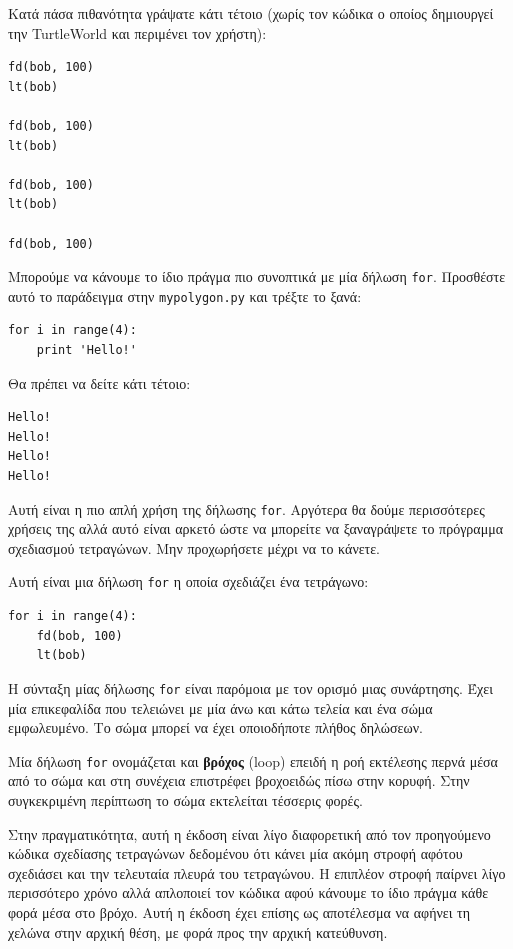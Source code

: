 \documentclass[10pt]{book}
\begin{document}
Κατά πάσα πιθανότητα γράψατε κάτι τέτοιο (χωρίς τον κώδικα ο οποίος δημιουργεί
την TurtleWorld και περιμένει τον χρήστη):

\begin{verbatim}
fd(bob, 100)
lt(bob)

fd(bob, 100)
lt(bob)

fd(bob, 100)
lt(bob)

fd(bob, 100)
\end{verbatim}
%

Μπορούμε να κάνουμε το ίδιο πράγμα πιο συνοπτικά με μία δήλωση  {\tt for}. 
Προσθέστε αυτό το παράδειγμα στην  {\tt mypolygon.py}  και τρέξτε το ξανά:


\begin{verbatim}
for i in range(4):
    print 'Hello!'
\end{verbatim}
%

Θα πρέπει να δείτε κάτι τέτοιο:


\begin{verbatim}
Hello!
Hello!
Hello!
Hello!
\end{verbatim}
%

Αυτή είναι η πιο απλή χρήση της δήλωσης {\tt for}. Αργότερα θα δούμε περισσότερες χρήσεις της αλλά αυτό είναι αρκετό ώστε να μπορείτε να ξαναγράψετε το πρόγραμμα σχεδιασμού τετραγώνων. Μην προχωρήσετε μέχρι να το κάνετε.

Αυτή είναι μια δήλωση {\tt for} η οποία σχεδιάζει ένα τετράγωνο:

\begin{verbatim}
for i in range(4):
    fd(bob, 100)
    lt(bob)
\end{verbatim}
%

Η σύνταξη μίας δήλωσης  {\tt for}  είναι παρόμοια με τον ορισμό μιας
συνάρτησης. Έχει μία επικεφαλίδα που τελειώνει με μία άνω και κάτω τελεία και ένα σώμα εμφωλευμένο. Το σώμα μπορεί να έχει οποιοδήποτε πλήθος δηλώσεων.

Μία δήλωση {\tt for} ονομάζεται και {\bf βρόχος} (loop) επειδή
η ροή εκτέλεσης περνά μέσα από το σώμα και στη συνέχεια επιστρέφει βροχοειδώς 
πίσω στην κορυφή. Στην συγκεκριμένη περίπτωση το σώμα εκτελείται τέσσερις φορές.

Στην πραγματικότητα, αυτή η έκδοση είναι λίγο διαφορετική από τον προηγούμενο
κώδικα σχεδίασης τετραγώνων δεδομένου ότι κάνει μία ακόμη στροφή αφότου σχεδιάσει και την τελευταία πλευρά του τετραγώνου. Η επιπλέον στροφή παίρνει λίγο περισσότερο χρόνο αλλά απλοποιεί τον κώδικα αφού  κάνουμε το ίδιο πράγμα κάθε φορά μέσα στο βρόχο. Αυτή η έκδοση έχει επίσης ως αποτέλεσμα να αφήνει τη χελώνα στην αρχική θέση, με φορά προς την αρχική κατεύθυνση.
\end{document}
